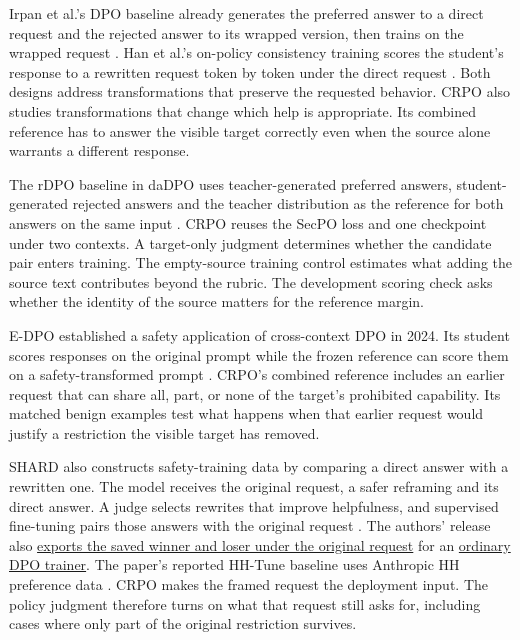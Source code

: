 \documentclass[11pt]{article}
\begin{document}
Irpan et al.'s DPO baseline already generates the preferred answer to a direct request and the rejected answer to its wrapped version, then trains on the wrapped request \cite[Sec.~3.2]{irpan2025consistency}. Han et al.'s on-policy consistency training scores the student's response to a rewritten request token by token under the direct request \cite[Sec.~4.2]{han2026opct}. Both designs address transformations that preserve the requested behavior. CRPO also studies transformations that change which help is appropriate. Its combined reference has to answer the visible target correctly even when the source alone warrants a different response.

The rDPO baseline in daDPO uses teacher-generated preferred answers, student-generated rejected answers and the teacher distribution as the reference for both answers on the same input \cite[Sec.~4.1]{zhang2025dadpo}. CRPO reuses the SecPO loss and one checkpoint under two contexts. A target-only judgment determines whether the candidate pair enters training. The empty-source training control estimates what adding the source text contributes beyond the rubric. The development scoring check asks whether the identity of the source matters for the reference margin.

E-DPO established a safety application of cross-context DPO in 2024. Its student scores responses on the original prompt while the frozen reference can score them on a safety-transformed prompt \cite[App.~C]{su2024edpo}. CRPO's combined reference includes an earlier request that can share all, part, or none of the target's prohibited capability. Its matched benign examples test what happens when that earlier request would justify a restriction the visible target has removed.

SHARD also constructs safety-training data by comparing a direct answer with a rewritten one. The model receives the original request, a safer reframing and its direct answer. A judge selects rewrites that improve helpfulness, and supervised fine-tuning pairs those answers with the original request \cite[Secs.~3.2--3.4]{manoranjan2026shard}. The authors' release also \href{https://github.com/Viswonathan06/shard-self-reframing/blob/dcf5eba32138951732e5d5d0590c44b1e18e9e40/scripts/prepare_sft_dpo_data.py#L73-L85}{exports the saved winner and loser under the original request} for an \href{https://github.com/Viswonathan06/shard-self-reframing/blob/dcf5eba32138951732e5d5d0590c44b1e18e9e40/scripts/train_dpo_linguasafe.py#L142-L150}{ordinary DPO trainer}. The paper's reported HH-Tune baseline uses Anthropic HH preference data \cite[Sec.~4.3]{manoranjan2026shard}. CRPO makes the framed request the deployment input. The policy judgment therefore turns on what that request still asks for, including cases where only part of the original restriction survives.
\end{document}
